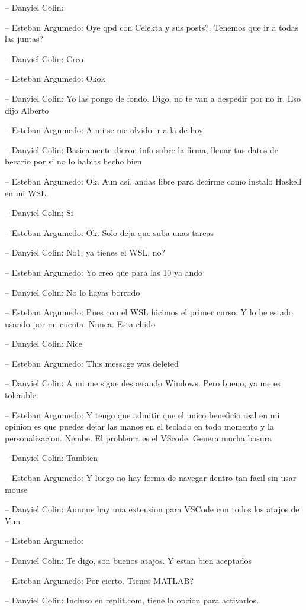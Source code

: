 -- Danyiel Colin:

-- Esteban Argumedo: Oye qpd con Celekta y sus posts?. Tenemos que ir a
todas las juntas?

-- Danyiel Colin: Creo

-- Esteban Argumedo: Okok

-- Danyiel Colin: Yo las pongo de fondo. Digo, no te van a despedir por
no ir. Eso dijo Alberto

-- Esteban Argumedo: A mi se me olvido ir a la de hoy

-- Danyiel Colin: Basicamente dieron info sobre la firma, llenar tus
datos de becario por si no lo habias hecho bien

-- Esteban Argumedo: Ok. Aun asi, andas libre para decirme como instalo
Haskell en mi WSL.

-- Danyiel Colin: Si

-- Esteban Argumedo: Ok. Solo deja que suba unas tareas

-- Danyiel Colin: No1, ya tienes el WSL, no?

-- Esteban Argumedo: Yo creo que para las 10 ya ando

-- Danyiel Colin: No lo hayas borrado

-- Esteban Argumedo: Pues con el WSL hicimos el primer curso. Y lo he
estado usando por mi cuenta. Nunca. Esta chido

-- Danyiel Colin: Nice

-- Esteban Argumedo: This message was deleted

-- Danyiel Colin: A mi me sigue desperando Windows. Pero bueno, ya me es
tolerable.

-- Esteban Argumedo: Y tengo que admitir que el unico beneficio real en
mi opinion es que puedes dejar las manos en el teclado en todo momento y
la personalizacion. Nembe. El problema es el VScode. Genera mucha basura

-- Danyiel Colin: Tambien

-- Esteban Argumedo: Y luego no hay forma de navegar dentro tan facil
sin usar mouse

-- Danyiel Colin: Aunque hay una extension para VSCode con todos los
atajos de Vim

-- Esteban Argumedo:

-- Danyiel Colin: Te digo, son buenos atajos. Y estan bien aceptados

-- Esteban Argumedo: Por cierto. Tienes MATLAB?

-- Danyiel Colin: Incluso en replit.com, tiene la opcion para
activarlos.

